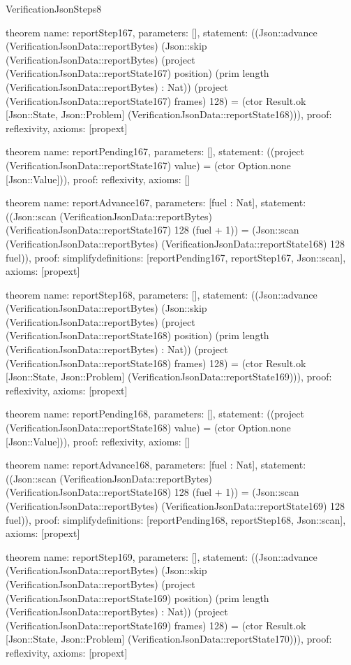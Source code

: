 \begin{lexlean}{VerificationJsonSteps8}
\begin{semanticmodule}
theorem{
  name: reportStep167,
  parameters: [],
  statement: ((Json::advance (VerificationJsonData::reportBytes) (Json::skip (VerificationJsonData::reportBytes) (project (VerificationJsonData::reportState167) position) (prim length (VerificationJsonData::reportBytes) : Nat)) (project (VerificationJsonData::reportState167) frames) 128) = (ctor Result.ok [Json::State, Json::Problem] (VerificationJsonData::reportState168))),
  proof: reflexivity{},
  axioms: [propext]
}

theorem{
  name: reportPending167,
  parameters: [],
  statement: ((project (VerificationJsonData::reportState167) value) = (ctor Option.none [Json::Value])),
  proof: reflexivity{},
  axioms: []
}

theorem{
  name: reportAdvance167,
  parameters: [fuel : Nat],
  statement: ((Json::scan (VerificationJsonData::reportBytes) (VerificationJsonData::reportState167) 128 (fuel + 1)) = (Json::scan (VerificationJsonData::reportBytes) (VerificationJsonData::reportState168) 128 fuel)),
  proof: simplify{definitions: [reportPending167, reportStep167, Json::scan]},
  axioms: [propext]
}

theorem{
  name: reportStep168,
  parameters: [],
  statement: ((Json::advance (VerificationJsonData::reportBytes) (Json::skip (VerificationJsonData::reportBytes) (project (VerificationJsonData::reportState168) position) (prim length (VerificationJsonData::reportBytes) : Nat)) (project (VerificationJsonData::reportState168) frames) 128) = (ctor Result.ok [Json::State, Json::Problem] (VerificationJsonData::reportState169))),
  proof: reflexivity{},
  axioms: [propext]
}

theorem{
  name: reportPending168,
  parameters: [],
  statement: ((project (VerificationJsonData::reportState168) value) = (ctor Option.none [Json::Value])),
  proof: reflexivity{},
  axioms: []
}

theorem{
  name: reportAdvance168,
  parameters: [fuel : Nat],
  statement: ((Json::scan (VerificationJsonData::reportBytes) (VerificationJsonData::reportState168) 128 (fuel + 1)) = (Json::scan (VerificationJsonData::reportBytes) (VerificationJsonData::reportState169) 128 fuel)),
  proof: simplify{definitions: [reportPending168, reportStep168, Json::scan]},
  axioms: [propext]
}

theorem{
  name: reportStep169,
  parameters: [],
  statement: ((Json::advance (VerificationJsonData::reportBytes) (Json::skip (VerificationJsonData::reportBytes) (project (VerificationJsonData::reportState169) position) (prim length (VerificationJsonData::reportBytes) : Nat)) (project (VerificationJsonData::reportState169) frames) 128) = (ctor Result.ok [Json::State, Json::Problem] (VerificationJsonData::reportState170))),
  proof: reflexivity{},
  axioms: [propext]
}


\end{semanticmodule}
\end{lexlean}
